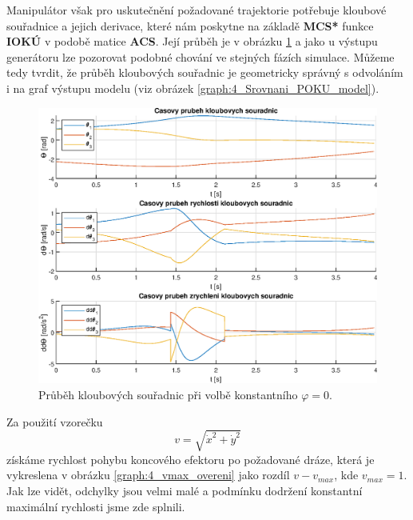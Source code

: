 \documentclass{article}
\begin{document}
			Manipulátor však pro uskutečnění požadované trajektorie potřebuje kloubové souřadnice a jejich derivace, které nám poskytne na základě \textbf{MCS*} funkce \textbf{IOKÚ} v podobě matice \textbf{ACS}. Její průběh je v obrázku \ref{graph:4_Kloub_souradnice} a jako u výstupu generátoru lze pozorovat podobné chování ve stejných fázích simulace. Můžeme tedy tvrdit, že průběh kloubových souřadnic je geometricky správný s odvoláním i na graf výstupu modelu (viz obrázek \ref{graph:4_Srovnani_POKU_model}).\\
				\begin{figure}[H]
					\centering
					\includegraphics[width=\textwidth]{./Graphics/4_Graphics/Kloub_souradnice.eps}
					\caption{Průběh kloubových souřadnic při volbě konstantního \(\varphi = 0\).}
					\label{graph:4_Kloub_souradnice}
				\end{figure}
			Za použití vzorečku \[v = \sqrt{\dot{x}^2+\dot{y}^2}\] získáme rychlost pohybu koncového efektoru po požadované dráze, která je vykreslena v obrázku \ref{graph:4_vmax_overeni} jako rozdíl \(v-v_{max}\), kde \(v_{max}=1\). Jak lze vidět, odchylky jsou velmi malé a podmínku dodržení konstantní maximální rychlosti jsme zde splnili.\\
\end{document}
